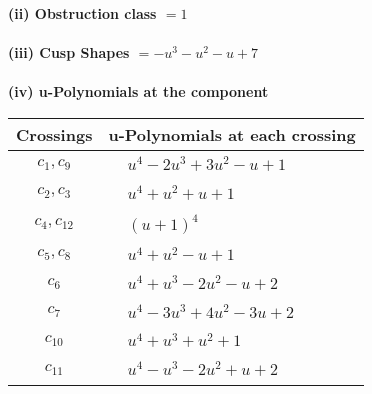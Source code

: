 \documentclass[1p]{elsarticle_modified}
\theoremstyle{definition}
\begin{document}
\flushleft \textbf{(ii) Obstruction class $= 1$}\\~\\
\flushleft \textbf{(iii) Cusp Shapes $= - u^3- u^2- u+7$}\\~\\
\newpage\renewcommand{\arraystretch}{1}
\flushleft \textbf{(iv) u-Polynomials at the component}\newline \\
\begin{tabular}{m{50pt}|m{274pt}}
Crossings & \hspace{64pt}u-Polynomials at each crossing \\
\hline $$\begin{aligned}c_{1},c_{9}\end{aligned}$$&$\begin{aligned}
&u^4-2 u^3+3 u^2- u+1
\end{aligned}$\\
\hline $$\begin{aligned}c_{2},c_{3}\end{aligned}$$&$\begin{aligned}
&u^4+u^2+u+1
\end{aligned}$\\
\hline $$\begin{aligned}c_{4},c_{12}\end{aligned}$$&$\begin{aligned}
&(u+1)^4
\end{aligned}$\\
\hline $$\begin{aligned}c_{5},c_{8}\end{aligned}$$&$\begin{aligned}
&u^4+u^2- u+1
\end{aligned}$\\
\hline $$\begin{aligned}c_{6}\end{aligned}$$&$\begin{aligned}
&u^4+u^3-2 u^2- u+2
\end{aligned}$\\
\hline $$\begin{aligned}c_{7}\end{aligned}$$&$\begin{aligned}
&u^4-3 u^3+4 u^2-3 u+2
\end{aligned}$\\
\hline $$\begin{aligned}c_{10}\end{aligned}$$&$\begin{aligned}
&u^4+u^3+u^2+1
\end{aligned}$\\
\hline $$\begin{aligned}c_{11}\end{aligned}$$&$\begin{aligned}
&u^4- u^3-2 u^2+u+2
\end{aligned}$\\
\hline
\end{tabular}\\~\\
\end{document}

